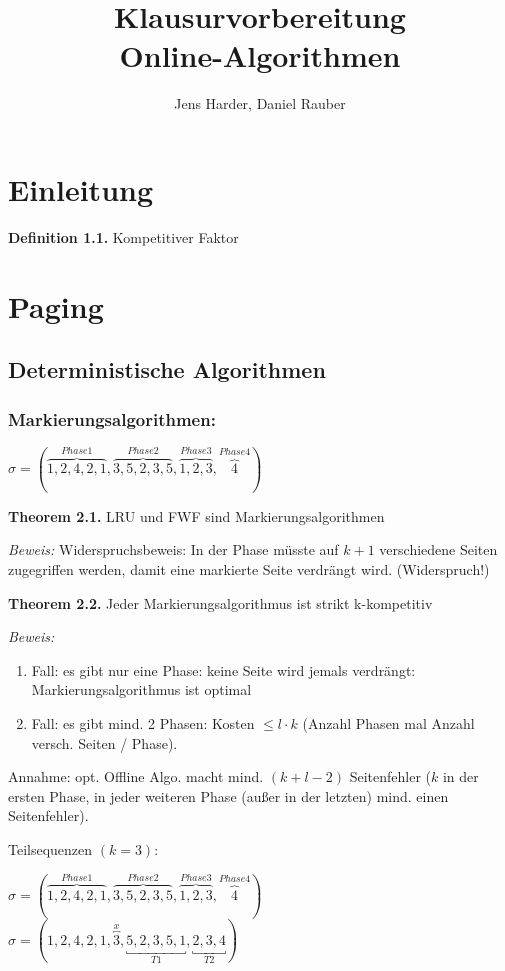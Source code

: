 \documentclass[a4paper]{report}
\title{Klausurvorbereitung\\Online-Algorithmen}
\author{Jens Harder, Daniel Rauber}
\date{}
\begin{document}
\maketitle

\chapter{Einleitung}

\textbf{Definition 1.1.} Kompetitiver Faktor

\chapter{Paging}

\section{Deterministische Algorithmen}

\subsection{Markierungsalgorithmen:}
$\sigma = (\overbrace{1, 2, 4, 2, 1}^{Phase 1},\overbrace{3, 5, 2, 3, 5}^{Phase 2},\overbrace{1, 2, 3}^{Phase 3},\overbrace{4}^{Phase 4})$



\textbf{Theorem 2.1.} LRU und FWF sind Markierungsalgorithmen

\textit{Beweis:} Widerspruchsbeweis: In der Phase müsste auf $k + 1$ verschiedene Seiten zugegriffen werden, damit eine markierte Seite verdrängt wird. (Widerspruch!)



\textbf{Theorem 2.2.} Jeder Markierungsalgorithmus ist strikt k-kompetitiv

\textit{Beweis:}
\begin{enumerate}
\item Fall: es gibt nur eine Phase: keine Seite wird jemals verdrängt: Markierungsalgorithmus ist optimal
\item Fall: es gibt mind. 2 Phasen: Kosten $\le l \cdot k$ (Anzahl Phasen mal Anzahl versch. Seiten / Phase).
\end{enumerate}
Annahme: opt. Offline Algo. macht mind. $(k + l - 2)$ Seitenfehler ($k$ in der ersten Phase, in jeder weiteren Phase (außer in der letzten) mind. einen Seitenfehler).

Teilsequenzen $(k=3)$:

$\sigma = (\overbrace{1, 2, 4, 2, 1}^{Phase 1},\overbrace{3, 5, 2, 3, 5}^{Phase 2},\overbrace{1, 2, 3}^{Phase 3},\overbrace{4}^{Phase 4})$\\
$\sigma = (1, 2, 4, 2, 1, \overbracket{3}^{x}, \underbracket{5, 2, 3, 5, 1}_{T1}, \underbracket{2, 3, 4}_{T2})$
\end{document}
